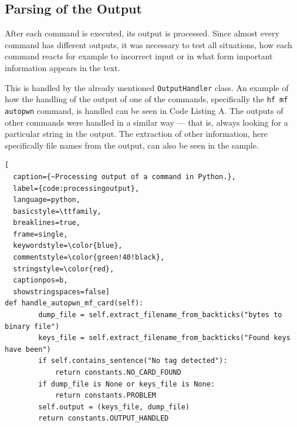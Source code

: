 \subsection{Parsing of the Output}

After each command is executed, its output is processed. Since almost every command has different outputs, it was necessary to test all situations, how each command reacts for example to incorrect input or in what form important information appears in the text. 

This is handled by the already mentioned \texttt{OutputHandler} class. An example of how the handling of the output of one of the commands, specifically the \texttt{hf mf autopwn} command, is handled can be seen in Code Listing A. The outputs of other commands were handled in a similar way --- that is, always looking for a particular string in the output. The extraction of other information, here specifically file names from the output, can also be seen in the sample.

\begin{lstlisting}[
  caption={~Processing output of a command in Python.},
  label={code:processingoutput},
  language=python,
  basicstyle=\ttfamily,
  breaklines=true,
  frame=single, 
  keywordstyle=\color{blue},
  commentstyle=\color{green!40!black}, 
  stringstyle=\color{red},
  captionpos=b,
  showstringspaces=false]
def handle_autopwn_mf_card(self):
        dump_file = self.extract_filename_from_backticks("bytes to binary file")
        keys_file = self.extract_filename_from_backticks("Found keys have been")
        if self.contains_sentence("No tag detected"):
            return constants.NO_CARD_FOUND
        if dump_file is None or keys_file is None:
            return constants.PROBLEM
        self.output = (keys_file, dump_file)
        return constants.OUTPUT_HANDLED
\end{lstlisting}
